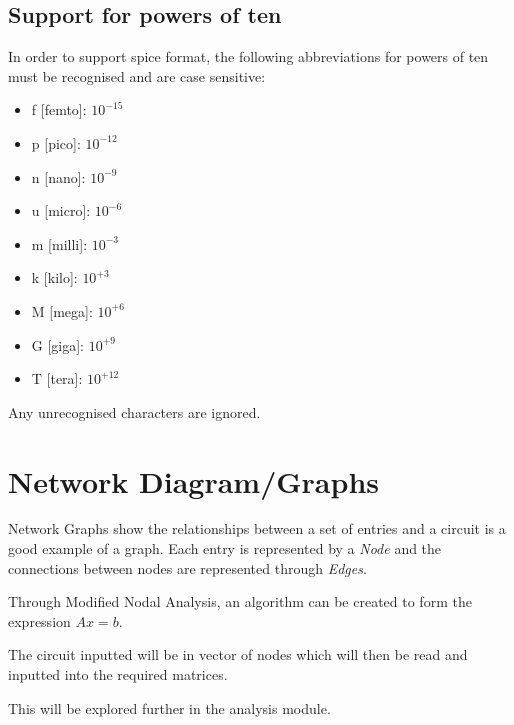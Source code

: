 \documentclass[a4paper, titlepage]{article}
\begin{document}
    \subsection{Support for powers of ten}
    In order to support {\selectfont spice} format, the following abbreviations for powers of ten 
    must be recognised and are case sensitive:
    \begin{multicols}{2}
    \begin{itemize}
        \item f [femto]: $ 10^{-15} $
        \item p [pico]: $ 10^{-12} $
        \item n [nano]: $ 10^{-9} $
        \item u [micro]: $ 10^{-6} $
        \item m [milli]: $ 10^{-3} $
        \item k [kilo]: $ 10^{+3} $
        \item M [mega]: $ 10^{+6} $
        \item G [giga]: $ 10^{+9} $
        \item T [tera]: $ 10^{+12} $
    \end{itemize}
    \end{multicols}
    Any unrecognised characters are ignored.

    \pagebreak
    \section{Network Diagram/Graphs}
    Network Graphs show the relationships between a set of entries and a circuit is a good example of a graph.
    Each entry is represented by a \textit{Node} and the connections between nodes are represented through \textit{Edges}.
    \par
    Through Modified Nodal Analysis, an algorithm can be created to form the expression $Ax = b$.
    \par
    The circuit inputted will be in vector of nodes which will then be read and inputted into the required matrices.

    \par
    This will be explored further in the analysis module.
    \pagebreak
\end{document}
